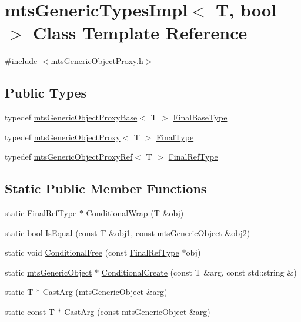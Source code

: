 \hypertarget{classmts_generic_types_impl}{}\section{mts\+Generic\+Types\+Impl$<$ T, bool $>$ Class Template Reference}
\label{classmts_generic_types_impl}


{\ttfamily \#include $<$mts\+Generic\+Object\+Proxy.\+h$>$}

\subsection*{Public Types}
\begin{DoxyCompactItemize}
\item 
typedef \hyperlink{classmts_generic_object_proxy_base}{mts\+Generic\+Object\+Proxy\+Base}$<$ T $>$ \hyperlink{classmts_generic_types_impl_a7997b5c3162967dd9f29b33ef5f1858a}{Final\+Base\+Type}
\item 
typedef \hyperlink{classmts_generic_object_proxy}{mts\+Generic\+Object\+Proxy}$<$ T $>$ \hyperlink{classmts_generic_types_impl_ad04e0f563e98adbcac5647ea821f4100}{Final\+Type}
\item 
typedef \hyperlink{classmts_generic_object_proxy_ref}{mts\+Generic\+Object\+Proxy\+Ref}$<$ T $>$ \hyperlink{classmts_generic_types_impl_a9f668541e03e4b56b77f94fa09ffbe96}{Final\+Ref\+Type}
\end{DoxyCompactItemize}
\subsection*{Static Public Member Functions}
\begin{DoxyCompactItemize}
\item 
static \hyperlink{classmts_generic_types_impl_a9f668541e03e4b56b77f94fa09ffbe96}{Final\+Ref\+Type} $\ast$ \hyperlink{classmts_generic_types_impl_aa175772f0e70fd7d1a9d0dc102ce724b}{Conditional\+Wrap} (T \&obj)
\item 
static bool \hyperlink{classmts_generic_types_impl_aca1b1cd6147ee5821b9af63fa8734ae6}{Is\+Equal} (const T \&obj1, const \hyperlink{classmts_generic_object}{mts\+Generic\+Object} \&obj2)
\item 
static void \hyperlink{classmts_generic_types_impl_a1dcdf3b2bde788bd9041124aaea8f2f3}{Conditional\+Free} (const \hyperlink{classmts_generic_types_impl_a9f668541e03e4b56b77f94fa09ffbe96}{Final\+Ref\+Type} $\ast$obj)
\item 
static \hyperlink{classmts_generic_object}{mts\+Generic\+Object} $\ast$ \hyperlink{classmts_generic_types_impl_a55a866567036c78e0bfd4ebf94ec375e}{Conditional\+Create} (const T \&arg, const std\+::string \&)
\item 
static T $\ast$ \hyperlink{classmts_generic_types_impl_a048024fa657e8ab5535dbedd7c654374}{Cast\+Arg} (\hyperlink{classmts_generic_object}{mts\+Generic\+Object} \&arg)
\item 
static const T $\ast$ \hyperlink{classmts_generic_types_impl_accff9cb086ac17c71f1c35601b1bbfbd}{Cast\+Arg} (const \hyperlink{classmts_generic_object}{mts\+Generic\+Object} \&arg)
\end{DoxyCompactItemize}


